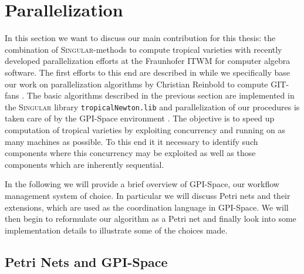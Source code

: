 \documentclass[
  paper=a4,
  titlepage,
  bibliography=totoc,
  listof=totoc,
  pagesize=pdftex
]{scrartcl}
\numberwithin{figure}{section}
\numberwithin{equation}{section}
\numberwithin{table}{section}
\theoremstyle{definition}
\numberwithin{definition}{section}
\begin{document}
\section{Parallelization}

In this section we want to discuss our main contribution for this thesis: the combination
of \textsc{Singular}-methods to compute tropical varieties with recently developed
parallelization efforts at the Fraunhofer ITWM for computer algebra software. The first
efforts to this end are described in \cite{towardsParallel} while we specifically base our
work on parallelization algorithms by Christian Reinbold to compute GIT-fans
\cite{reinboldGitFan}. The basic algorithms described in the previous section are
implemented in the \textsc{Singular} library \texttt{tropicalNewton.lib}
\cite{tropNewtLib} and parallelization of our procedures is taken care of by the GPI-Space
environment \cite{gpispace}. The objective is to speed up computation of tropical
varieties by exploiting concurrency and running on as many machines as possible. To this
end it it necessary to identify such components where this concurrency may be exploited as
well as those components which are inherently sequential.

In the following we will provide a brief overview of GPI-Space, our workflow management
system of choice. In particular we will discuss Petri nets and their extensions, which are
used as the coordination language in GPI-Space. We will then begin to reformulate our
algorithm as a Petri net and finally look into some implementation details to illustrate
some of the choices made.

\subsection{Petri Nets and GPI-Space}
\end{document}
